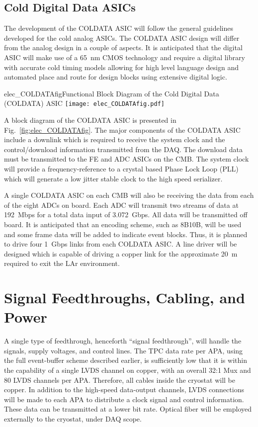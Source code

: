 \subsection{Cold Digital Data ASICs}
\label{subsec:fe_CMOS_digital}

The development of the COLDATA ASIC will follow the general guidelines developed for the cold analog ASICs.
The COLDATA ASIC design will differ from the analog design in a couple of aspects.
It is anticipated that the digital ASIC will make use of a 65~nm CMOS technology and require a
digital library with accurate cold timing models allowing for high level language design and
automated place and route for design blocks using extensive digital logic.  

\begin{cdrfigure}{elec_COLDATAfig}{Functional Block Diagram of the Cold Digital Data (COLDATA) ASIC}
\texttt{[image: elec\_COLDATAfig.pdf]}
\end{cdrfigure}

A block diagram of the COLDATA ASIC is presented in Fig.~\ref{fig:elec_COLDATAfig}.
The major components of the COLDATA ASIC include a downlink which is required to receive the system clock and
the control/download information transmitted from the DAQ.
The download data must be transmitted to the FE and ADC ASICs on the CMB.
The system clock will provide a frequency-reference to a crystal based Phase Lock Loop (PLL)
which will generate a low jitter stable clock to the high speed serializer. 

A single COLDATA ASIC on each CMB will also be receiving the data from each of the eight ADCs on board.
Each ADC will transmit two streams of data at 192~Mbps for a total data input of 3.072~Gbps.
All data will be transmitted off board.
It is anticipated that an encoding scheme, such as 8B10B, will be used and
some frame data will be added to indicate event blocks.
Thus, it is planned to drive four 1~Gbps links from each COLDATA ASIC.
A line driver will be designed which is capable of driving a copper link for the approximate 20~m required
to exit the LAr environment. 

%
\section{Signal Feedthroughs, Cabling, and Power}
\label{sec:ce_feedthrough}

A single type of feedthrough, henceforth ``signal feedthrough'', will handle the signals, supply voltages, and control lines.
The TPC data rate per APA, using the full event-buffer scheme described earlier,
is sufficiently low that it is within the capability of a single LVDS channel on copper,
with an overall 32:1 Mux and 80 LVDS channels per APA.
Therefore, all cables inside the cryostat will be copper.
In addition to the high-speed data-output channels,
LVDS connections will be made to each APA to distribute a clock signal and control information.
These data can be transmitted at a lower bit rate.
Optical fiber will be employed externally to the cryostat, under DAQ scope.

